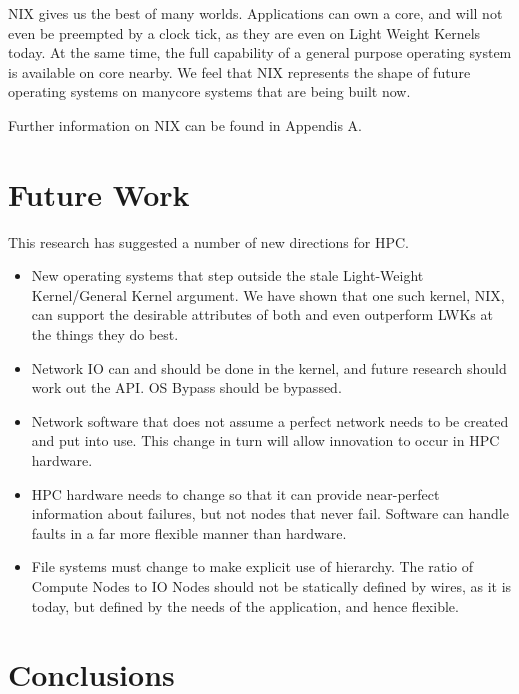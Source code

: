 \documentclass{report}
\begin{document}
NIX gives us the best of many worlds. Applications can own a core, 
and will not even be preempted by a clock tick, as they are even 
on Light Weight Kernels today. At the same time, the full capability 
of a general purpose operating system is available on core nearby. 
We feel that NIX represents the shape of future operating systems
on manycore systems that are being built now. 

Further information on NIX can be found in Appendis A. 

\chapter{Future Work}
This research has suggested a number of new directions for HPC. 
\begin{itemize}
\item New operating systems that step outside the stale Light-Weight Kernel/General Kernel
argument. We have shown that one such kernel, NIX, can support the desirable attributes of both
and even outperform LWKs at the things they do best. 
\item Network IO can and should be done in the kernel, and future research should 
work out the API. OS Bypass should be bypassed. 
\item Network software that does not assume a perfect network needs to be created and put into use.
This change in turn will allow innovation to occur in 
HPC hardware. 
\item HPC hardware needs to change so that it can provide near-perfect
information about failures, but not nodes that never fail. Software 
can handle faults in a far more flexible manner than hardware. 
\item File systems must change to make explicit use of hierarchy. The ratio of Compute Nodes to IO Nodes should not be 
statically defined by wires, as it is today, but defined by the needs of the application, and hence flexible. 
\end{itemize}

\chapter{Conclusions}
\end{document}
